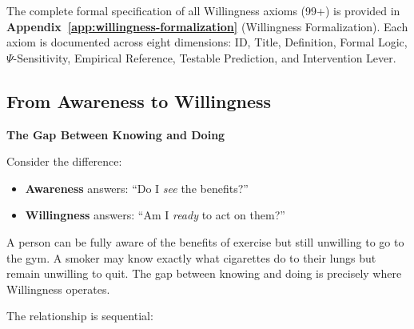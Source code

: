 \begin{note}
The complete formal specification of all Willingness axioms (99+) is provided in 
\textbf{Appendix~\ref{app:willingness-formalization}} (Willingness Formalization). 
Each axiom is documented across eight dimensions: ID, Title, Definition, 
Formal Logic, $\Psi$-Sensitivity, Empirical Reference, Testable Prediction, 
and Intervention Lever.
\end{note}

\subsection{From Awareness to Willingness}
\label{subsec:12-1-from-awareness}

\begin{intuition}
\textbf{The Gap Between Knowing and Doing}

Consider the difference:
\begin{itemize}
\item \textbf{Awareness} answers: ``Do I \textit{see} the benefits?''
\item \textbf{Willingness} answers: ``Am I \textit{ready} to act on them?''
\end{itemize}

A person can be fully aware of the benefits of exercise but still unwilling 
to go to the gym. A smoker may know exactly what cigarettes do to their lungs 
but remain unwilling to quit. The gap between knowing and doing is precisely 
where Willingness operates.
\end{intuition}

The relationship is sequential:

\begin{center}
\end{center}

